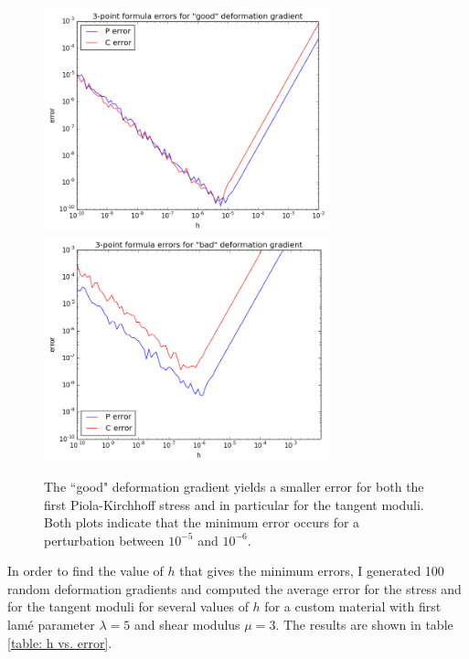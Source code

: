 \documentclass[]{spie}  %
\begin{document}
\begin{figure}[h]
	\centering
	\includegraphics[width=3.25in]{error_good_F.png} \quad
	\includegraphics[width=3.25in]{error_bad_F.png} 
	\caption{The ``good" deformation gradient yields a smaller error for both the first Piola-Kirchhoff stress and in particular for the tangent moduli. Both plots indicate that the minimum error occurs for a perturbation between $10^{-5}$ and $10^{-6}$.} 
	\label{fig: numerical differentiation error}
\end{figure}

In order to find the value of $h$ that gives the minimum errors, I generated 100 random deformation gradients and computed the average error for the stress and for the tangent moduli for several values of $h$ for a custom material with first lam\'e parameter $\lambda = 5$ and shear modulus $\mu = 3$. The results are shown in table \ref{table: h vs. error}.
\end{document}
